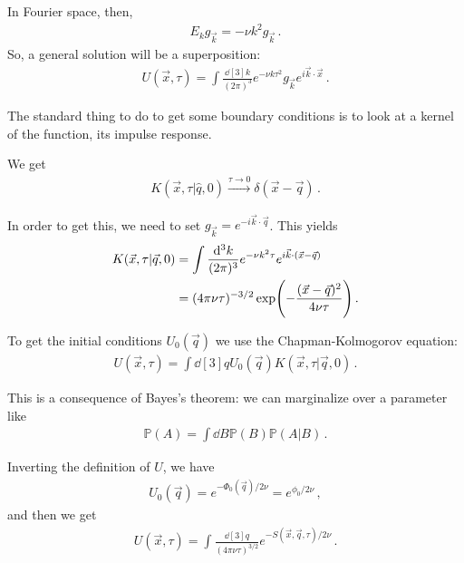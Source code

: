 \documentclass[main.tex]{subfiles}
\begin{document}
In Fourier space, then, 
%
\begin{align}
E_k g_{\vec{k}} = - \nu k^2 g_{\vec{k}}
\,.
\end{align}
%
So, a general solution will be a superposition: 
%
\begin{align}
U(\vec{x}, \tau ) = \int \frac{ \dd[3]{k}}{(2 \pi )^3}
e^{- \nu k \tau^2} g_{\vec{k}} e^{i \vec{k} \cdot \vec{x}}
\,. 
\end{align}

The standard thing to do to get some boundary conditions is to look at a kernel of the function, its impulse response.

We get 
%
\begin{align}
K(\vec{x}, \tau | \hat{q}, 0) \overset{\tau \to 0}{ \to } \delta (\vec{x} - \vec{q})
\,.
\end{align}

In order to get this, we need to set \(g_{\vec{k}} = e^{- i \vec{k} \cdot \vec{q}}\). 
This yields 
%
\begin{subequations}
\begin{align}
K (\vec{x}, \tau | \vec{q}, 0) &=
\int \frac{ \dd[3]{k}}{(2\pi )^3} e^{- \nu k^2\tau } e^{i \vec{k} \cdot \qty(\vec{x} - \vec{q})}  \\
&= (4 \pi \nu \tau )^{-3/2} \exp(- \frac{(\vec{x} - \vec{q})^2}{4 \nu \tau })
\,.
\end{align}
\end{subequations}

To get the initial conditions \(U_0 (\vec{q})\) we use the Chapman-Kolmogorov equation: 
%
\begin{align}
U(\vec{x}, \tau ) = \int \dd[3]{q} U_0 (\vec{q}) K(\vec{x}, \tau | \vec{q}, 0)
\,.
\end{align}

This is a consequence of Bayes's theorem: we can marginalize over a parameter like
%
\begin{align}
\mathbb{P}(A) = \int \dd{B} \mathbb{P}(B) \mathbb{P}(A | B)
\,.
\end{align}

Inverting the definition of \(U\), we have 
%
\begin{align}
U_0 (\vec{q}) = e^{- \Phi_0 (\vec{q})  / 2 \nu } = e^{ \phi_0 / 2 \nu }
\,,
\end{align}
%
and then we get 
%
\begin{align}
U(\vec{x}, \tau ) = \int \frac{ \dd[3]{q}}{(4 \pi \nu \tau )^{3/2}}
e^{- S(\vec{x}, \vec{q}, \tau )  / 2 \nu }
\,.
\end{align}
\end{document}
